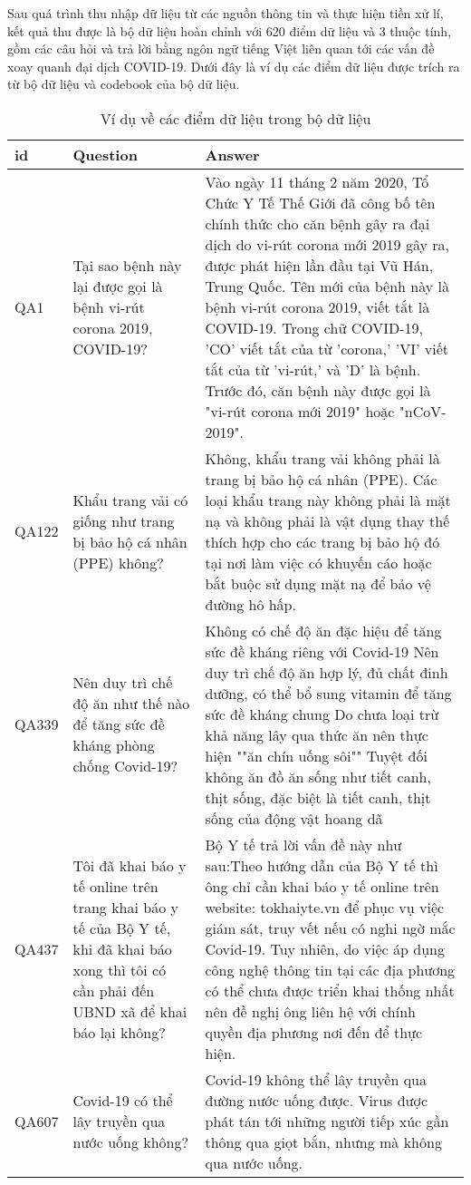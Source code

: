 \documentclass[runningheads]{llncs}
\begin{document}
Sau quá trình thu nhập dữ liệu từ các nguồn thông tin và thực hiện tiền xử lí, kết quả thu được là bộ dữ liệu hoàn chỉnh với 620 điểm dữ liệu và 3 thuộc tính, gồm các câu hỏi và trả lời bằng ngôn ngữ tiếng Việt liên quan tới các vấn đề xoay quanh đại dịch COVID-19. Dưới đây là ví dụ các điểm dữ liệu được trích ra từ bộ dữ liệu và codebook của bộ dữ liệu.

\begin{table}
	\setlength{\tabcolsep}{0.5em}
	\renewcommand{\arraystretch}{1.4}
	\begin{center}
	\caption{Ví dụ về các điểm dữ liệu trong bộ dữ liệu}\label{tab4}
		\begin{tabular}{ | p{1.25cm} | p{5cm} | p{5cm} |} 
			\hline
    		\textbf{id} & \textbf{Question} & \textbf{Answer}\\ 
			\hline
			QA1 & Tại sao bệnh này lại được gọi là bệnh vi-rút corona 2019, COVID-19?&Vào ngày 11 tháng 2 năm 2020, Tổ Chức Y Tế Thế Giới đã công bố tên chính thức cho căn bệnh gây ra đại dịch do vi-rút corona mới 2019 gây ra, được phát hiện lần đầu tại Vũ Hán, Trung Quốc. Tên mới của bệnh này là bệnh vi-rút corona 2019, viết tắt là COVID-19. Trong chữ COVID-19, 'CO' viết tắt của từ 'corona,' 'VI' viết tắt của từ 'vi-rút,' và 'D' là bệnh. Trước đó, căn bệnh này được gọi là "vi-rút corona mới 2019" hoặc "nCoV-2019".
			\\ 
			\hline
			QA122&Khẩu trang vải có giống như trang bị bảo hộ cá nhân (PPE) không?&Không, khẩu trang vải không phải là trang bị bảo hộ cá nhân (PPE). Các loại khẩu trang này không phải là mặt nạ và không phải là vật dụng thay thế thích hợp cho các trang bị bảo hộ đó tại nơi làm việc có khuyến cáo hoặc bắt buộc sử dụng mặt nạ để bảo vệ đường hô hấp.
			\\
			\hline
			QA339&Nên duy trì chế độ ăn như thế nào để tăng sức đề kháng phòng chống Covid-19?&Không có chế độ ăn đặc hiệu để tăng sức đề kháng riêng với Covid-19  
			Nên duy trì chế độ ăn hợp lý, đủ chất đinh dưỡng, có thể bổ sung vitamin để tăng sức đề kháng chung Do chưa loại trừ khả năng lây qua thức ăn nên thực hiện ""ăn chín uống sôi"" Tuyệt đối không ăn đồ ăn sống như tiết canh, thịt sống, đặc biệt là tiết canh, thịt sống của động vật hoang dã\\
			\hline
			QA437&Tôi đã khai báo y tế online trên trang khai báo y tế của Bộ Y tế, khi đã khai báo xong thì tôi có cần phải đến UBND xã để khai báo lại không?&Bộ Y tế trả lời vấn đề này như sau:Theo hướng dẫn của Bộ Y tế thì ông chỉ cần khai báo y tế online trên website: tokhaiyte.vn để phục vụ việc giám sát, truy vết nếu có nghi ngờ mắc Covid-19. Tuy nhiên, do việc áp dụng công nghệ thông tin tại các địa phương có thể chưa được triển khai thống nhất nên đề nghị ông liên hệ với chính quyền địa phương nơi đến để thực hiện.\\
			\hline
			QA607& Covid-19 có thể lây truyền qua nước uống không? &Covid-19 không thể lây truyền qua đường nước uống được. Virus được phát tán tới những người tiếp xúc gần thông qua giọt bắn, nhưng mà không qua nước uống.\\
			\hline
			\end{tabular}
		\end{center}
\end{table}
\end{document}
